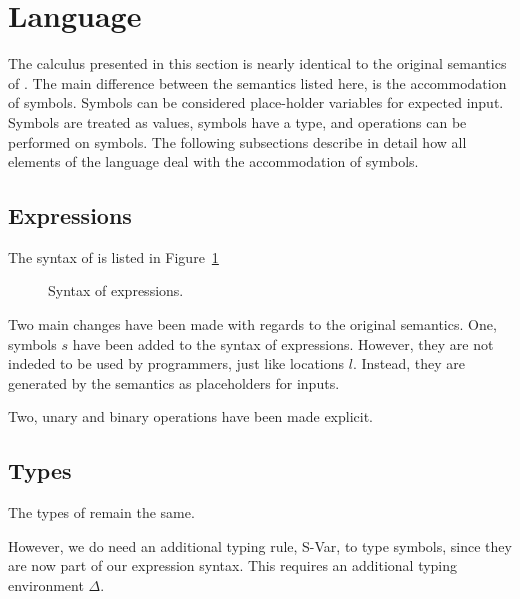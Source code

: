 

\section{Language}
\label{sec:language}

The calculus presented in this section is nearly identical to the original semantics of \TOPHAT.
The main difference between the semantics listed here, is the accommodation of symbols.
Symbols can be considered place-holder variables for expected input.
Symbols are treated as values, symbols have a type, and operations can be performed on symbols.
The following subsections describe in detail how all elements of the \TOPHAT language deal with the accommodation of symbols.


\subsection{Expressions}
\label{expressions}

The syntax of \TOPHAT is listed in Figure~\ref{fig:syntaxtophat}

\begin{figure}




\caption{Syntax of \TOPHAT expressions.}
  \label{fig:syntaxtophat}
\end{figure}

Two main changes have been made with regards to the original \TOPHAT semantics.
One, symbols $s$ have been added to the syntax of expressions.
However, they are not indeded to be used by programmers, just like locations $l$.
Instead, they are generated by the semantics as placeholders for inputs.

Two, unary and binary operations have been made explicit.

\subsection{Types}

The types of \TOPHAT remain the same.


However, we do need an additional typing rule, S-Var, to type symbols,
since they are now part of our expression syntax.
This requires an additional typing environment $\Delta$.

